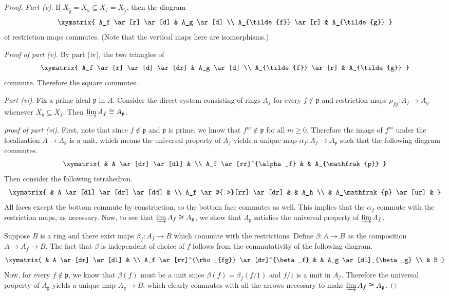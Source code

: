 \begin{proof}
\emph{Part (v)}.
If $ X_{\tilde{g}} = X_g \subseteq X_f = X_{\tilde{f}}$, then the diagram
\[ \xymatrix{
A_f \ar[r] \ar[d] & A_g \ar[d] \\
A_{\tilde{f}} \ar[r] & A_{\tilde{g}}
} \]
of restriction maps commutes. (Note that the vertical maps here are isomorphisms.)

\emph{Proof of part (v)}.
By part (iv), the two triangles of
\[ \xymatrix{
A_f \ar[r] \ar[d] \ar[dr] & A_g \ar[d] \\
A_{\tilde{f}} \ar[r] & A_{\tilde{g}}
} \]
commute. Therefore the square commutes.

\emph{Part (vi)}.
Fix a prime ideal $ \mathfrak{p}$ in $ A$. Consider the direct system consisting of rings $ A_f$ for every $ f \notin \mathfrak{p}$ and restriction maps $ \rho_{fg} : A_f \to A_g$ whenever $ X_g \subseteq X_f$. Then $ \varinjlim A_f \cong A_{\mathfrak{p}}$.

\emph{proof of part (vi)}.
First, note that since $ f \notin \mathfrak{p}$ and $ \mathfrak{p}$ is prime, we know that $ f^m \notin \mathfrak{p}$ for all $ m \geq 0$. Therefore the image of $ f^m$ under the localization $ A \to A_\mathfrak{p}$ is a unit, which means the universal property of $ A_f$ yields a unique map $ \alpha_f : A_f \to A_\mathfrak{p}$ such that the following diagram commutes.
\[ \xymatrix{
& A \ar[dr] \ar[dl] & \\
A_f \ar[rr]^{\alpha_f} & & A_{\mathfrak{p}}
} \]
Then consider the following tetrahedron.
\[ \xymatrix{
& A \ar[dl] \ar[dr] \ar[dd] & \\
A_f \ar@{.>}[rr] \ar[dr] & & A_h \\
& A_\mathfrak{p} \ar[ur] &
} \]
All faces except the bottom commute by construction, so the bottom face commutes as well. This implies that the $ \alpha_f$ commute with the restriction maps, as necessary. Now, to see that $ \varinjlim A_f \cong A_\mathfrak{p}$, we show that $ A_\mathfrak{p}$ satisfies the universal property of $ \varinjlim A_f$.

Suppose $ B$ is a ring and there exist maps $ \beta_f : A_f \to B$ which commute with the restrictions. Define $ \beta : A \to B$ as the composition $ A \to A_f \to B$. The fact that $ \beta$ is independent of choice of $ f$ follows from the commutativity of the following diagram.
\[ \xymatrix{
& A \ar[dr] \ar[dl] & \\
A_f \ar[rr]^{\rho_{fg}} \ar[dr]^{\beta_f} & & A_g \ar[dl]_{\beta_g} \\
& B
} \]
Now, for every $ f \notin \mathfrak{p}$, we know that $ \beta(f)$ must be a unit since $ \beta(f) = \beta_f(f/1)$ and $ f/1$ is a unit in $ A_f$. Therefore the universal property of $ A_\mathfrak{p}$ yields a unique map $ A_{\mathfrak{p}} \to B$, which clearly commutes with all the arrows necessary to make $ \varinjlim A_f \cong A_\mathfrak{p}$.
\end{proof}


